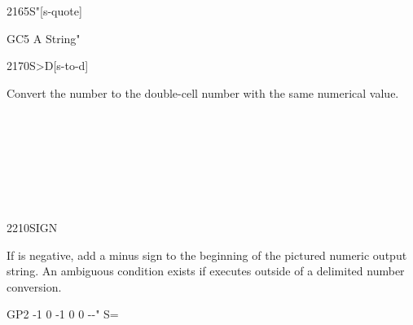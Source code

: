 \begin{worddef}[Sq]{2165}{S"}[s-quote]
\begin{testing}
		\word{:} GC5  A String" \word{;}   \\

		 \quad {} 
	\end{testing}
\end{worddef}

\vspace*{-1ex}
\begin{worddef}[StoD]{2170}{S>D}[s-to-d]
\item {}

	Convert the number  to the double-cell number 
	with the same numerical value.

	\begin{testing} %
		 \\
		 \\
		 \\
		 \\
		 \\
		 \\
	\end{testing}
\end{worddef}

\vspace*{-1ex}
\begin{worddef}{2210}{SIGN}
\item {}

	If  is negative, add a minus sign to the beginning of
	the pictured numeric output string. An ambiguous condition exists
	if  executes outside of a  
	delimited number conversion.

	\begin{testing} %
		\ttfamily
		\word{:} GP2   -1  0  -1  0 0   -{}-" S= \word{;} \\
	\end{testing}
\end{worddef}

